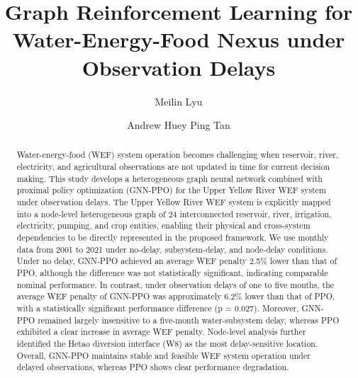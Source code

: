 \documentclass [a4paper,fleqn] {cas-dc}
\begin{document}
\let\WriteBookmarks\relax


\title[mode=title]{Graph Reinforcement Learning for Water-Energy-Food Nexus under Observation Delays}

\author[1,2]{Meilin Lyu}

\author[1]{Andrew Huey Ping Tan}
\cormark[1]




\begin{abstract}
Water-energy-food (WEF) system operation becomes challenging when reservoir, river, electricity, and agricultural observations are not updated in time for current decision making. This study develops a heterogeneous graph neural network combined with proximal policy optimization (GNN-PPO) for the Upper Yellow River WEF system under observation delays. The Upper Yellow River WEF system is explicitly mapped into a node-level heterogeneous graph of 24 interconnected reservoir, river, irrigation, electricity, pumping, and crop entities, enabling their physical and cross-system dependencies to be directly represented in the proposed framework. We use monthly data from 2001 to 2021 under no-delay, subsystem-delay, and node-delay conditions. Under no delay, GNN-PPO achieved an average WEF penalty 2.5\% lower than that of PPO, although the difference was not statistically significant, indicating comparable nominal performance. In contrast, under observation delays of one to five months, the average WEF penalty of GNN-PPO was approximately 6.2\% lower than that of PPO, with a statistically significant performance difference (p = 0.027). Moreover, GNN-PPO remained largely insensitive to a five-month water-subsystem delay, whereas PPO exhibited a clear increase in average WEF penalty. Node-level analysis further identified the Hetao diversion interface (W8) as the most delay-sensitive location. Overall, GNN-PPO maintains stable and feasible WEF system operation under delayed observations, whereas PPO shows clear performance degradation.
\end{abstract}
\end{document}
